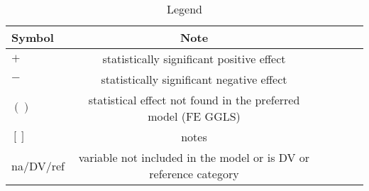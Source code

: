 \begin{table}[!htb]
\centering
\caption{Legend}
\label{table_legend}
\begin{tabular}{lccccc}
\toprule
Symbol    & Note \\
\midrule
$+$       & statistically significant positive effect                         \\
$-$       & statistically significant negative effect                         \\
$()$      & statistical effect not found in the preferred model (FE GGLS)     \\
$[]$      & notes                                                             \\
na/DV/ref & variable not included in the model or is DV or reference category \\
\bottomrule
\end{tabular}
\end{table}
